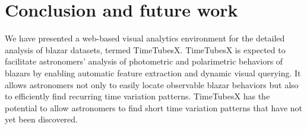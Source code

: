 \section{Conclusion and future work\label{sec:conclusion}}
We have presented a web-based visual analytics environment for the detailed analysis of blazar datasets, termed TimeTubesX. %
TimeTubesX is expected to facilitate astronomers’ analysis of photometric and polarimetric behaviors of blazars 
by enabling automatic feature extraction and dynamic visual querying.
It allows astronomers not only to easily locate observable blazar behaviors but also to efficiently find recurring time variation patterns.
TimeTubesX has the potential to allow astronomers to find short time variation patterns that have not yet been discovered.


